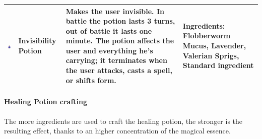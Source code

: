 \begin{tabular}{m{2cm}m{2cm}m{6cm}m{5cm} }
	\includegraphics[width=2cm]{../Pictures/Gameplay/Items/Consumables/Potions/Invisibility_potion_picture.png} & \textbf{Invisibility Potion} & Makes the user invisible. In battle the potion lasts 3 turns, out of battle it lasts one minute. The potion affects the user and everything he's carrying; it terminates when the user attacks, casts a spell, or shifts form. & Ingredients: Flobberworm Mucus, Lavender, Valerian Sprigs, Standard ingredient \\ \hline
\end{tabular}

\clearpage

\paragraph {Healing Potion crafting}
The more ingredients are used to craft the healing potion, the stronger is the resulting effect, thanks to an higher concentration of the magical essence.

